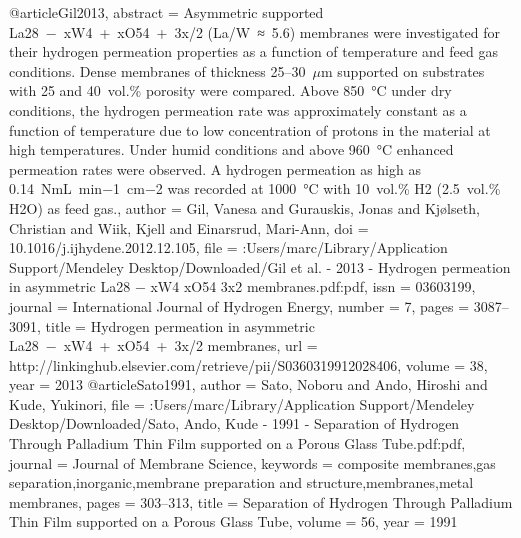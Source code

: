 @article{Gil2013,
abstract = {Asymmetric supported La28 − xW4 + xO54 + 3x/2 (La/W ≈ 5.6) membranes were investigated for their hydrogen permeation properties as a function of temperature and feed gas conditions. Dense membranes of thickness 25–30 $\mu$m supported on substrates with 25 and 40 vol.{\%} porosity were compared. Above 850 °C under dry conditions, the hydrogen permeation rate was approximately constant as a function of temperature due to low concentration of protons in the material at high temperatures. Under humid conditions and above 960 °C enhanced permeation rates were observed. A hydrogen permeation as high as 0.14 NmL min−1 cm−2 was recorded at 1000 °C with 10 vol.{\%} H2 (2.5 vol.{\%} H2O) as feed gas.},
author = {Gil, Vanesa and Gurauskis, Jonas and Kj{\o}lseth, Christian and Wiik, Kjell and Einarsrud, Mari-Ann},
doi = {10.1016/j.ijhydene.2012.12.105},
file = {:Users/marc/Library/Application Support/Mendeley Desktop/Downloaded/Gil et al. - 2013 - Hydrogen permeation in asymmetric La28 − xW4 xO54 3x2 membranes.pdf:pdf},
issn = {03603199},
journal = {International Journal of Hydrogen Energy},
number = {7},
pages = {3087--3091},
title = {{Hydrogen permeation in asymmetric La28 − xW4 + xO54 + 3x/2 membranes}},
url = {http://linkinghub.elsevier.com/retrieve/pii/S0360319912028406},
volume = {38},
year = {2013}
}
@article{Sato1991,
author = {Sato, Noboru and Ando, Hiroshi and Kude, Yukinori},
file = {:Users/marc/Library/Application Support/Mendeley Desktop/Downloaded/Sato, Ando, Kude - 1991 - Separation of Hydrogen Through Palladium Thin Film supported on a Porous Glass Tube.pdf:pdf},
journal = {Journal of Membrane Science},
keywords = {composite membranes,gas separation,inorganic,membrane preparation and structure,membranes,metal membranes},
pages = {303--313},
title = {{Separation of Hydrogen Through Palladium Thin Film supported on a Porous Glass Tube}},
volume = {56},
year = {1991}
}
